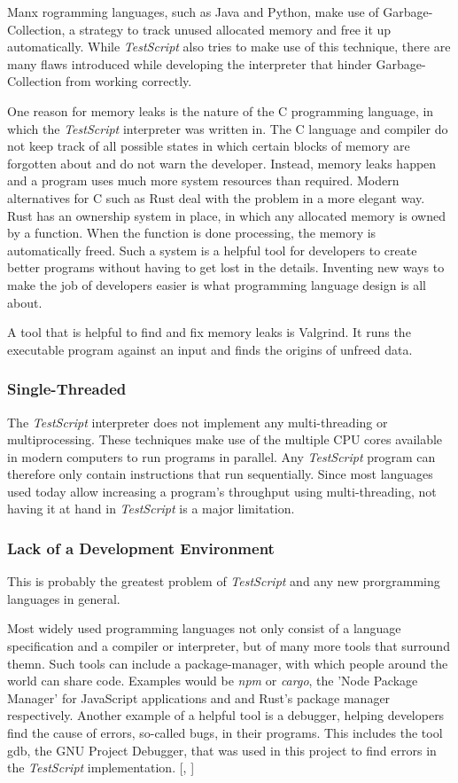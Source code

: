\documentclass[12pt,a4paper]{article}
\newcommand{\name}{\emph{TestScript}}
\begin{document}
Manx rogramming languages, such as Java and Python,
make use of Garbage-Collection, a strategy to track unused allocated memory and
free it up automatically. While \name{} also tries to make use of this technique,
there are many flaws introduced while developing the interpreter that hinder 
Garbage-Collection from working correctly.

One reason for memory leaks is the nature of the
C programming language, in which the \name{} interpreter was written in. The C language and
compiler do not keep track of all possible states in which certain blocks of memory are
forgotten about and do not warn the developer. Instead, memory leaks happen and a program
uses much more system resources than required.
Modern alternatives for C such as Rust deal with the problem in a more elegant way. 
Rust has an ownership system in place,
in which any allocated memory is owned by a function. When the function
is done processing, the memory is automatically freed. Such a system
is a helpful tool for developers to create better programs without having to get
lost in the details.
Inventing new ways to make the job of developers easier is what programming
language design is all about.

A tool that is helpful to find and fix memory leaks is Valgrind. It runs
the executable program against an input and finds the origins of unfreed data.

\subsubsection{Single-Threaded}
The \name{} interpreter does not implement any multi-threading or multiprocessing.
These techniques make use of the multiple CPU cores available in modern computers
to run programs in parallel.
Any \name{} program can therefore
only contain instructions that run sequentially.
Since most languages used today allow increasing a
program's throughput using multi-threading, not having it at hand in \name{}
is a major limitation.

\subsubsection{Lack of a Development Environment}
This is probably the greatest problem of \name{} and any new prorgramming
languages in general.

Most widely used programming languages not only consist
of a language specification and a compiler or interpreter, but of many more
tools that surround themn.
Such tools can include a package-manager, with which people around the world
can share code. Examples would be \emph{npm} or \emph{cargo}, 
the 'Node Package Manager' for JavaScript applications and and Rust's package 
manager respectively.
Another example of a helpful tool is a debugger, helping developers
find the cause of errors, so-called bugs, in their programs.
This includes the tool gdb, the GNU Project Debugger, that was used in this
project to find errors in the \name{} implementation.
[, ]
\end{document}
